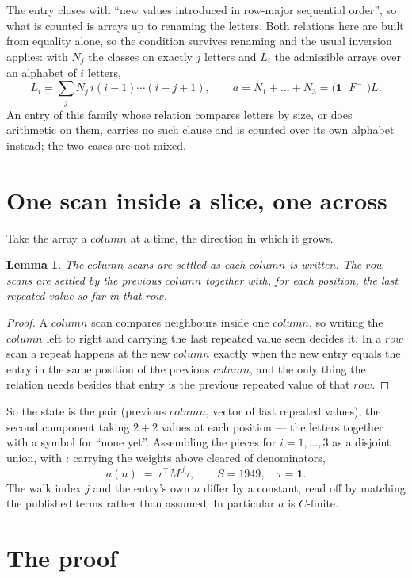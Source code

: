 \documentclass[11pt,a4paper]{article}
\theoremstyle{plain}
\newtheorem{lemma}[theorem]{Lemma}
\theoremstyle{definition}
\begin{document}
The entry closes with ``new values introduced in row-major sequential order'', so what is
counted is arrays up to renaming the letters. Both relations here are built from equality
alone, so the condition survives renaming and the usual inversion applies: with $N_j$ the
classes on exactly $j$ letters and $L_i$ the admissible arrays over an alphabet of $i$ letters,
\[
L_i=\sum_j N_j\,i(i-1)\cdots(i-j+1),\qquad
a=N_1+\dots+N_{3}=\bigl(\mathbf{1}^{\!\top}F^{-1}\bigr)L .
\]
An entry of this family whose relation compares letters by size, or does arithmetic on them,
carries no such clause and is counted over its own alphabet instead; the two cases are not
mixed.

\section{One scan inside a slice, one across}

Take the array a $column$ at a time, the direction in which it grows.

\begin{lemma}\label{lem:state}
The $column$ scans are settled as each $column$ is written. The $row$ scans are
settled by the previous $column$ together with, for each position, the last repeated value
so far in that $row$.
\end{lemma}

\begin{proof}
A $column$ scan compares neighbours inside one $column$, so writing the
$column$ left to right and carrying the last repeated value seen decides it. In a
$row$ scan a repeat happens at the new $column$ exactly when the new entry equals the
entry in the same position of the previous $column$, and the only thing the relation needs
besides that entry is the previous repeated value of that $row$.
\end{proof}

So the state is the pair (previous $column$, vector of last repeated values), the second
component taking $2+2$ values at each position --- the letters together with a symbol for
``none yet''. Assembling the pieces for $i=1,\dots,3$ as a disjoint union, with $\iota$ carrying the weights above cleared of denominators,
\[
a(n)\;=\;\iota^{\!\top}M^{\,j}\tau ,\qquad S=1949,\quad\tau=\mathbf{1} .
\]
The walk index $j$ and the entry's own $n$ differ by a constant, read off by matching the
published terms rather than assumed. In particular $a$ is $C$-finite.

\section{The proof}
\end{document}
